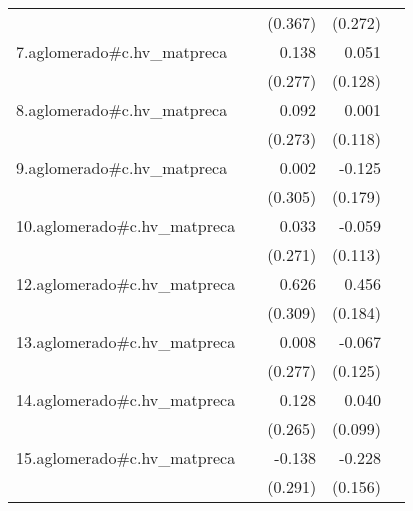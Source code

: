 {\begin{longtable}{l*{4}{D{.}{.}{-1}}}
            &                     &     (0.367)         &     (0.272)         &                     \\
\addlinespace
7.aglomerado#c.hv\_matpreca&                     &       0.138         &       0.051         &                     \\
            &                     &     (0.277)         &     (0.128)         &                     \\
\addlinespace
8.aglomerado#c.hv\_matpreca&                     &       0.092         &       0.001         &                     \\
            &                     &     (0.273)         &     (0.118)         &                     \\
\addlinespace
9.aglomerado#c.hv\_matpreca&                     &       0.002         &      -0.125         &                     \\
            &                     &     (0.305)         &     (0.179)         &                     \\
\addlinespace
10.aglomerado#c.hv\_matpreca&                     &       0.033         &      -0.059         &                     \\
            &                     &     (0.271)         &     (0.113)         &                     \\
\addlinespace
12.aglomerado#c.hv\_matpreca&                     &       0.626\sym{*}  &       0.456\sym{*}  &                     \\
            &                     &     (0.309)         &     (0.184)         &                     \\
\addlinespace
13.aglomerado#c.hv\_matpreca&                     &       0.008         &      -0.067         &                     \\
            &                     &     (0.277)         &     (0.125)         &                     \\
\addlinespace
14.aglomerado#c.hv\_matpreca&                     &       0.128         &       0.040         &                     \\
            &                     &     (0.265)         &     (0.099)         &                     \\
\addlinespace
15.aglomerado#c.hv\_matpreca&                     &      -0.138         &      -0.228         &                     \\
            &                     &     (0.291)         &     (0.156)         &                     \\

\end{longtable}}
